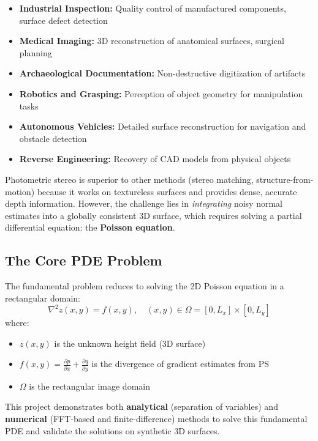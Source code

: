 \documentclass[11pt]{article}
\begin{document}
\begin{itemize}
\item \textbf{Industrial Inspection:} Quality control of manufactured components, surface defect detection
\item \textbf{Medical Imaging:} 3D reconstruction of anatomical surfaces, surgical planning
\item \textbf{Archaeological Documentation:} Non-destructive digitization of artifacts
\item \textbf{Robotics and Grasping:} Perception of object geometry for manipulation tasks
\item \textbf{Autonomous Vehicles:} Detailed surface reconstruction for navigation and obstacle detection
\item \textbf{Reverse Engineering:} Recovery of CAD models from physical objects
\end{itemize}

Photometric stereo is superior to other methods (stereo matching, structure-from-motion) because it works on textureless surfaces and provides dense, accurate depth information. However, the challenge lies in \textit{integrating} noisy normal estimates into a globally consistent 3D surface, which requires solving a partial differential equation: the \textbf{Poisson equation}.

\subsection{The Core PDE Problem}

The fundamental problem reduces to solving the 2D Poisson equation in a rectangular domain:
\begin{equation}\label{eq:poisson_main}
\nabla^2 z(x,y) = f(x,y), \quad (x,y) \in \Omega = [0, L_x] \times [0, L_y]
\end{equation}
where:
\begin{itemize}
\item $z(x,y)$ is the unknown height field (3D surface)
\item $f(x,y) = \frac{\partial p}{\partial x} + \frac{\partial q}{\partial y}$ is the divergence of gradient estimates from PS
\item $\Omega$ is the rectangular image domain
\end{itemize}

This project demonstrates both \textbf{analytical} (separation of variables) and \textbf{numerical} (FFT-based and finite-difference) methods to solve this fundamental PDE and validate the solutions on synthetic 3D surfaces.
\end{document}
